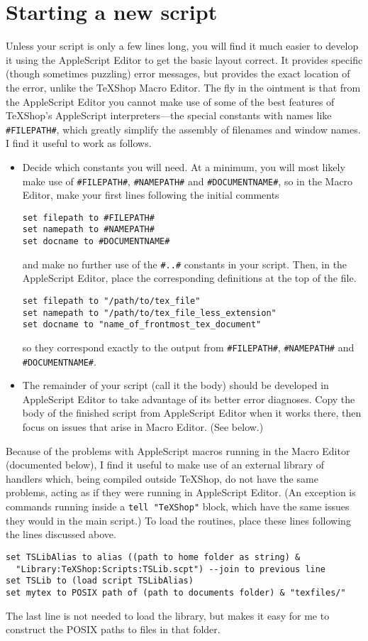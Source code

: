 \documentclass[11pt]{amsart}
\begin{document}
\section{Starting a new script}
Unless your script is only a few lines long, you will find it much easier to develop it using the AppleScript Editor to get the basic layout correct. It provides specific (though sometimes puzzling) error messages, but provides the exact location of the error, unlike  the TeXShop Macro Editor. The fly in the ointment is that from the AppleScript Editor you cannot make use of some of the best features of TeXShop's AppleScript interpreters---the special constants with names like \verb|#FILEPATH#|, which greatly simplify the assembly of filenames and window names. I find it useful to work as follows. 
\begin{itemize}
\item
Decide which constants you will need. At  a minimum, you will most likely make use of \verb|#FILEPATH#|, \verb|#NAMEPATH#| and \verb|#DOCUMENTNAME#|, so in the Macro Editor, make your first lines following the initial comments 
\begin{verbatim}
set filepath to #FILEPATH#
set namepath to #NAMEPATH#
set docname to #DOCUMENTNAME#
\end{verbatim}
and make no further use of the \verb|#..#| constants in your script. Then, in the AppleScript Editor, place the corresponding definitions at the top of the file.
\begin{verbatim}
set filepath to "/path/to/tex_file"
set namepath to "/path/to/tex_file_less_extension"
set docname to "name_of_frontmost_tex_document"
\end{verbatim}
so they correspond exactly to the output from \verb|#FILEPATH#|, \verb|#NAMEPATH#| and \verb|#DOCUMENTNAME#|. 
\item
The remainder of your script (call it the body) should be developed in AppleScript Editor to take advantage of its better error diagnoses. Copy the body of the finished script from AppleScript Editor when it works there, then focus on issues that arise in Macro Editor. (See below.)
\end{itemize}
Because of the problems with AppleScript macros running in the Macro Editor (documented below), I find it useful to make use of an external library of handlers which, being compiled outside TeXShop, do not have the same problems, acting as if they were running in AppleScript Editor. (An exception is commands running inside a {\tt tell "TeXShop"} block, which have the same issues they would in the main script.) To load the routines, place these lines following the lines discussed above.
\begin{verbatim}
set TSLibAlias to alias ((path to home folder as string) &
  "Library:TeXShop:Scripts:TSLib.scpt") --join to previous line
set TSLib to (load script TSLibAlias)
set mytex to POSIX path of (path to documents folder) & "texfiles/"
\end{verbatim}
The last line is not needed to load the library, but makes it easy for me to construct the POSIX paths to files in that folder.
\end{document}
